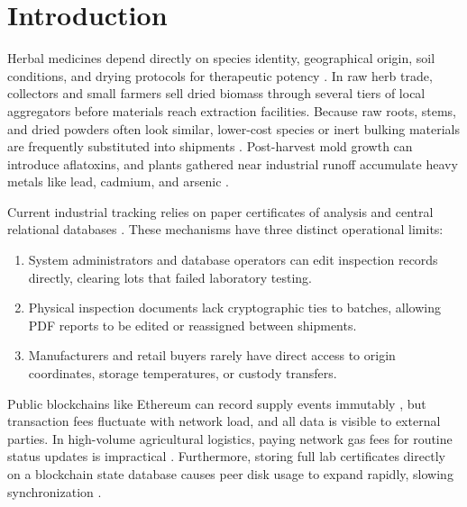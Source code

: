 \documentclass[conference]{IEEEtran}
\begin{document}
\section{Introduction}
Herbal medicines depend directly on species identity, geographical origin, soil conditions, and drying protocols for therapeutic potency \cite{singh2021ayurvedic, worldhealth2011quality, mukherjee2021botanical}. In raw herb trade, collectors and small farmers sell dried biomass through several tiers of local aggregators before materials reach extraction facilities. Because raw roots, stems, and dried powders often look similar, lower-cost species or inert bulking materials are frequently substituted into shipments \cite{khatri2021herbal}. Post-harvest mold growth can introduce aflatoxins, and plants gathered near industrial runoff accumulate heavy metals like lead, cadmium, and arsenic \cite{worldhealth2011quality}.

Current industrial tracking relies on paper certificates of analysis and central relational databases \cite{clauson2018leveraging}. These mechanisms have three distinct operational limits:
\begin{enumerate}
    \item System administrators and database operators can edit inspection records directly, clearing lots that failed laboratory testing.
    \item Physical inspection documents lack cryptographic ties to batches, allowing PDF reports to be edited or reassigned between shipments.
    \item Manufacturers and retail buyers rarely have direct access to origin coordinates, storage temperatures, or custody transfers.
\end{enumerate}

Public blockchains like Ethereum can record supply events immutably \cite{kamilaris2019rise, clauson2018leveraging}, but transaction fees fluctuate with network load, and all data is visible to external parties. In high-volume agricultural logistics, paying network gas fees for routine status updates is impractical \cite{monrat2019performance}. Furthermore, storing full lab certificates directly on a blockchain state database causes peer disk usage to expand rapidly, slowing synchronization \cite{dwivedi2021decentralized}.
\end{document}
